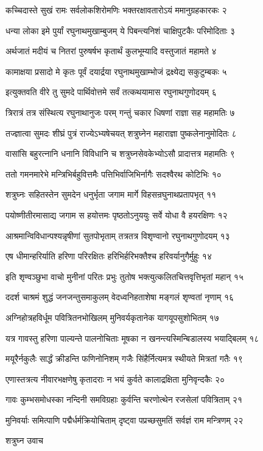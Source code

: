 कच्चिदास्ते सुखं रामः सर्वलोकशिरोमणिः
भक्तरक्षावतारोऽयं ममानुग्रहकारकः २

धन्या लोका इमे पुर्यां रघुनाथमुखाम्बुजम्
ये पिबन्त्यनिशं चाक्षिपुटकैः परिमोदिताः ३

अर्थजातं मदीयं च नितरां पुरुषर्षभ
कृतार्थं कुलभूम्यादि वस्तुजातं महामते ४

कामाक्षया प्रसादो मे कृतः पूर्वं दयार्द्रया
रघुनाथमुखाम्भोजं द्रक्ष्येद्य सकुटुम्बकः ५

इत्युक्तवति वीरे तु सुमदे पार्थिवोत्तमे
सर्वं तत्कथयामास रघुनाथगुणोदयम् ६

त्रिरात्रं तत्र संस्थित्य रघुनाथानुजः परम्
गन्तुं चकार धिषणां राज्ञा सह महामतिः ७

तज्ज्ञात्वा सुमदः शीघ्रं पुत्रं राज्येऽभ्यषेचयत्
शत्रुघ्नेन महाराज्ञा पुष्कलेनानुमोदितः ८

वासांसि बहुरत्नानि धनानि विविधानि च
शत्रुघ्नसेवकेभ्योऽसौ प्रादात्तत्र महामतिः ९

ततो गमनमारेभे मन्त्रिभिर्बहुवित्तमैः
पत्तिभिर्वाजिभिर्नागैः सदश्वैरथ कोटिभिः १०

शत्रुघ्नः सहितस्तेन सुमदेन धनुर्भृता
जगाम मार्गे विहसन्रघुनाथप्रतापभृत् ११

पयोष्णीतीरमासाद्य जगाम स हयोत्तमः
पृष्ठतोऽनुययुः सर्वे योधा वै हयरक्षिणः १२

आश्रमान्विविधान्पश्यन्नृषीणां सुतपोभृताम्
तत्रतत्र विशृण्वानो रघुनाथगुणोदयम् १३

एष धीमान्हरिर्याति हरिणा परिरक्षितः
हरिभिर्हरिभक्तैश्च हरिवर्यानुगैर्मुहुः १४

इति शृण्वञ्छुभा वाचो मुनीनां परितः प्रभुः
तुतोष भक्त्युत्कलितचित्तवृत्तिभृतां महान् १५

ददर्श चाश्रमं शुद्धं जनजन्तुसमाकुलम्
वेदध्वनिहताशेषा मङ्गलं शृण्वतां नृणाम् १६

अग्निहोत्रहविर्धूम पवित्रितनभोखिलम्
मुनिवर्यकृतानेक यागयूपसुशोभितम् १७

यत्र गावस्तु हरिणा पाल्यन्ते पालनोचिताः
मूषका न खनन्त्यस्मिन्बिडालस्य भयाद्बिलम् १८

मयूरैर्नकुलैः सार्द्धं क्रीडन्ति फणिनोनिशम्
गजैः सिंहैर्नित्यमत्र स्थीयते मित्रतां गतैः १९

एणास्तत्रत्य नीवारभक्षणेषु कृतादराः
न भयं कुर्वते कालाद्रक्षिता मुनिवृन्दकैः २०

गावः कुम्भसमोधस्का नन्दिनी समविग्रहाः
कुर्वन्ति चरणोत्थेन रजसेलां पवित्रिताम् २१

मुनिवर्याः समित्पाणि पद्मैर्धर्मक्रियोचिताम्
दृष्ट्वा पप्रच्छसुमतिं सर्वज्ञं राम मन्त्रिणम् २२

शत्रुघ्न उवाच

